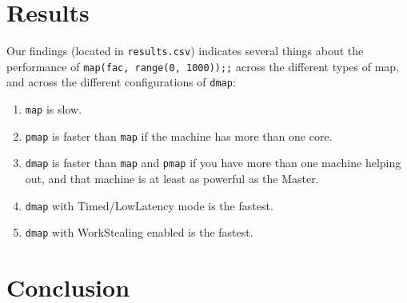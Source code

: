 \documentclass[letterpaper,twocolumn,10pt]{article}
\begin{document}
\section{Results}

Our findings (located in \verb|results.csv|) indicates several things about the
performance of \verb|map(fac, range(0, 1000));;| across the different types of
map, and across the different configurations of \verb|dmap|:

\begin{enumerate}
    \item \verb|map| is slow.
    \item \verb|pmap| is faster than \verb|map| if the machine has more than
        one core.
    \item \verb|dmap| is faster than \verb|map| and \verb|pmap| if you have
        more than one machine helping out, and that machine is at least as
        powerful as the Master.
    \item \verb|dmap| with Timed/LowLatency mode is the fastest.
    \item \verb|dmap| with WorkStealing enabled is the fastest.
\end{enumerate}

\section{Conclusion}
\end{document}
